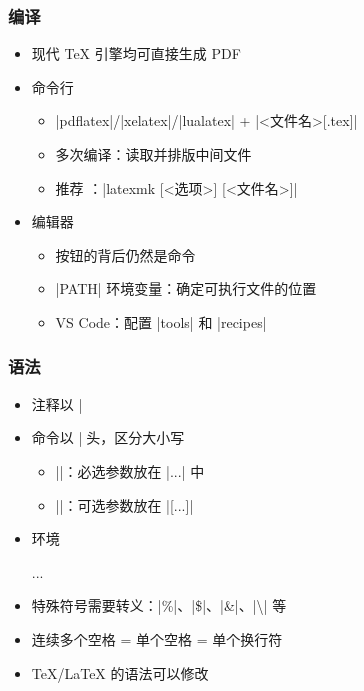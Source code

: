 \begin{frame}[fragile]
\frametitle{编译}
\begin{itemize}
  \item 现代 \TeX{} 引擎均可直接生成 PDF \pause
  \item 命令行

    \begin{itemize}
      \item |pdflatex|/|xelatex|/|lualatex| + |<文件名>[.tex]|
      \item 多次编译：读取并排版中间文件 \pause
      \item 推荐 ：|latexmk [<选项>] [<文件名>]|
    \end{itemize} \pause

  \item 编辑器

    \begin{itemize}
      \item 按钮的背后仍然是命令
      \item |PATH| 环境变量：确定可执行文件的位置
      \item VS Code：配置 |tools| 和 |recipes|
    \end{itemize}
\end{itemize}
\end{frame}

\begin{frame}[fragile]
\frametitle{语法}
\begin{itemize}
  \item 注释以 |%
  \item 命令以 |\| 开头，区分大小写

    \begin{itemize}
      \item ||：必选参数放在 |{...}| 中
      \item ||：可选参数放在 |[...]|
    \end{itemize}

  \item 环境

    \begin{texcode}[gobble=4, emph={[1]env}]
      \begin{env}
        ...
      \end{env}
    \end{texcode}

  \item 特殊符号需要转义：|\%|、|\$|、|\&|、|\textbackslash| 等
  \item 连续多个空格 = 单个空格 = 单个换行符 \pause
  \item \TeX{}/\LaTeX{} 的语法可以修改
\end{itemize}
\end{frame}

